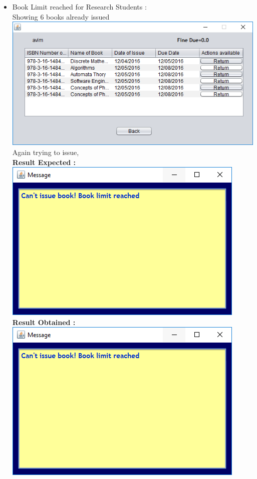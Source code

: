 \documentclass{article}
\begin{document}
\begin{enumerate}
\begin{itemize}
\item Book Limit reached for Research Students :\\
Showing 6 books already issued\\
\includegraphics[scale=0.8]{images/BookLimitRS.PNG}\\
Again trying to issue,\\
\textbf{Result Expected :}\\
\includegraphics[scale=0.8]{images/BookLimitError.PNG}\\
\textbf{Result Obtained :}\\
\includegraphics[scale=0.8]{images/BookLimitError.PNG}\\

\end{itemize}
\end{enumerate}
\end{document}
